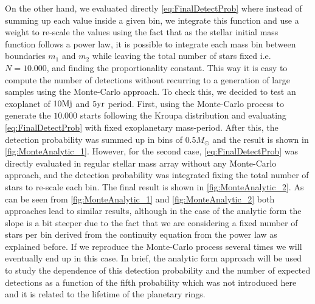 On the other hand, we evaluated directly \autoref{eq:FinalDetectProb} where instead of summing up each value inside a given bin, we integrate this function and use a weight to re-scale the values using the fact that as the stellar initial mass function follows a power law, it is possible to integrate each mass bin between boundaries $m_1$ and $m_2$ while leaving the total number of stars fixed i.e. $N = 10.000$, and finding the proportionality constant. This way it is easy to compute the number of detections without recurring to a generation of large samples using the Monte-Carlo approach. To check this, we decided to test an exoplanet of $10\textnormal{Mj}$ and $5\textnormal{yr}$ period. First, using the Monte-Carlo process to generate the $10.000$ starts following the Kroupa distribution and evaluating \autoref{eq:FinalDetectProb} with fixed exoplanetary mass-period. After this, the detection probability was summed up in bins of $0.5M_\odot$ and the result is shown in \autoref{fig:MonteAnalytic_1}. However, for the second case, \autoref{eq:FinalDetectProb} was directly evaluated in regular stellar mass array without any Monte-Carlo approach, and the detection probability was integrated fixing the total number of stars to re-scale each bin. The final result is shown in \autoref{fig:MonteAnalytic_2}. As can be seen from \autoref{fig:MonteAnalytic_1} and \autoref{fig:MonteAnalytic_2} both approaches lead to similar results, although in the case of the analytic form the slope is a bit steeper due to the fact that we are considering a fixed number of stars per bin derived from the continuity equation from the power law as explained before. If we reproduce the Monte-Carlo process several times we will eventually end up in this case. In brief, the analytic form approach will be used to study the dependence of this detection probability and the number of expected detections as a function of the fifth probability which was not introduced here and it is related to the lifetime of the planetary rings.\\

